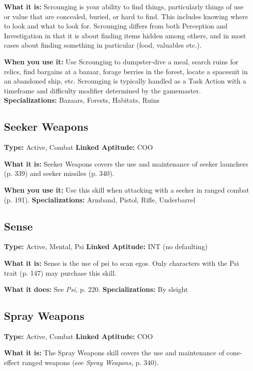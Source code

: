 \textbf{What it is:} Scrounging is your ability to find things, 
particularly things of use or value that are concealed, 
buried, or hard to find. This includes knowing where 
to look and what to look for. Scrounging differs from 
both Perception and Investigation in that it is about 
finding items hidden among others, and in most cases 
about finding something in particular (food, valuables
etc.).

\textbf{When you use it:} Use Scrounging to dumpster-dive a 
meal, search ruins for relics, find bargains at a bazaar, 
forage berries in the forest, locate a spacesuit in an 
abandoned ship, etc. Scrounging is typically handled 
as a Task Action with a timeframe and difficulty 
modifier determined by the gamemaster.
\textbf{Specializations:} Bazaars, Forests, Habitats, Ruins

\subsection{Seeker Weapons}

\textbf{Type:} Active, Combat
\textbf{Linked Aptitude:} COO

\textbf{What it is:} Seeker Weapons covers the use and 
maintenance of seeker launchers (p. 339) and seeker 
missiles (p. 340).

\textbf{When you use it:} Use this skill when attacking with 
a seeker in ranged combat (p. 191).
\textbf{Specializations:} Armband, Pistol, Rifle, Underbarrel

\subsection{Sense}

\textbf{Type:} Active, Mental, Psi
\textbf{Linked Aptitude:} INT (no defaulting)

\textbf{What it is:} Sense is the use of psi to scan egos. Only 
characters with the Psi trait (p. 147) may purchase 
this skill.

\textbf{What it does:} See \textit{Psi,} p. 220.
\textbf{Specializations:} By sleight

\subsection{Spray Weapons}

\textbf{Type:} Active, Combat
\textbf{Linked Aptitude:} COO

\textbf{What it is:} The Spray Weapons skill covers the use 
and maintenance of cone-effect ranged weapons (see 
\textit{Spray Weapons,} p. 340).

